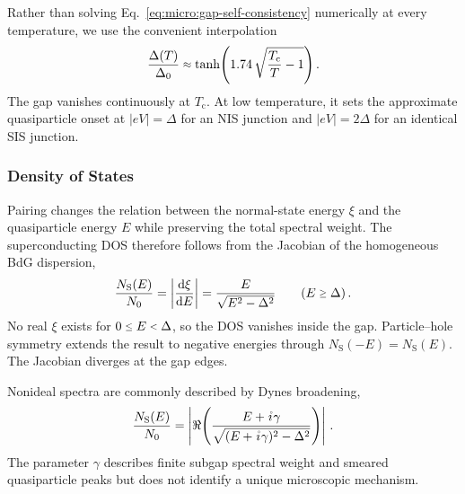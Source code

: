             Rather than solving Eq.~\eqref{eq:micro:gap-self-consistency} numerically at every temperature, we use the convenient interpolation
            \begin{equation}
                \frac{\Delta(T)}{\Delta_0}
                    \sapprox \tanh\!\left(
                        1.74\,\sqrt{\frac{T_\mathrm{c}}{T} - 1}
                    \right).
                \label{eq:micro:gap-temperature}
            \end{equation}
            The gap vanishes continuously at $T_\mathrm{c}$. At low temperature, it sets the approximate quasiparticle onset at $|eV|=\Delta$ for an NIS junction and $|eV|=2\Delta$ for an identical SIS junction. \cite{muhlschlegel_thermodynamischen_1959,tinkham_introduction_2004}

        \subsubsection*{Density of States}
        \label{subsubsec:micro:density-of-states}

            Pairing changes the relation between the normal-state energy $\xi$ and the quasiparticle energy $E$ while preserving the total spectral weight. The superconducting DOS therefore follows from the Jacobian of the homogeneous BdG dispersion,
            \begin{equation}
                \frac{N_\mathrm{S}(E)}{N_0}
                = \left|\frac{\mathrm d\xi}{\mathrm dE}\right|
                = \frac{E}{\sqrt{E^2-\Delta^2}}
                \qquad (E\sgeq{}\Delta)\,.
                \label{eq:micro:dos-bcs}
            \end{equation}
            No real $\xi$ exists for $0\sleq{} E\slt{}\Delta$, so the DOS vanishes inside the gap. Particle--hole symmetry extends the result to negative energies through $N_\mathrm{S}(-E)=N_\mathrm{S}(E)$. The Jacobian diverges at the gap edges. \cite{bardeen_theory_1957,tinkham_introduction_2004}

            Nonideal spectra are commonly described by Dynes broadening,
            \begin{equation}
                \frac{N_\mathrm{S}(E)}{N_0}
                    = \left|\Re\!\left(
                        \frac{E+\ima\gamma}{
                        \sqrt{(E+\ima\gamma)^{2}-\Delta^{2}}}
                    \right)\right|\,.
                \label{eq:micro:dos-dynes}
            \end{equation}
            The parameter $\gamma$ describes finite subgap spectral weight and smeared quasiparticle peaks but does not identify a unique microscopic mechanism. \cite{dynes_direct_1978,plecenik_finite-quasiparticle-lifetime_1994}

